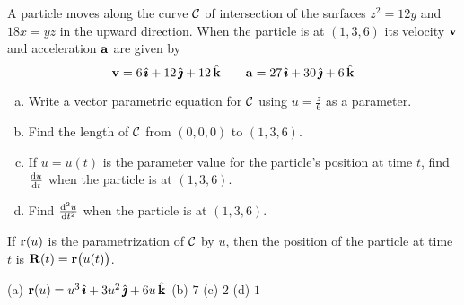 \begin{question}[M317 2000A] %
 A particle moves along the curve $\mathcal{C}$ of intersection of
the surfaces $z^2=12y$ and $18x=yz$ in the upward direction. When the particle
is at $(1,3,6)$ its velocity $\mathbf{v}$ and acceleration $\mathbf{a}$ are given by
$$
\mathbf{v} =6\,\hat{\pmb{\imath}}+12\,\hat{\pmb{\jmath}}+12\,\hat{\mathbf{k}}\qquad
\mathbf{a} = 27\,\hat{\pmb{\imath}}+30\,\hat{\pmb{\jmath}}+6\,\hat{\mathbf{k}}
$$
\begin{enumerate}[(a)]
\item
 Write a vector parametric equation for $\mathcal{C}$ using 
$u=\frac{z}{6}$ as a parameter.
\item
 Find the length of $\mathcal{C}$ from $(0,0,0)$ to $(1,3,6)$.
\item
 If $u=u(t)$ is the parameter value for the particle's position
at time $t$, find $\diff{u}{t}$ when the particle is at $(1,3,6)$.
\item
 Find $\difftwo{u}{t}$ when the particle is at $(1,3,6)$.
\end{enumerate}
\end{question}

\begin{hint} 
If $\mathbf{r}(u)$ is the parametrization of $\mathcal{C}$ by $u$, then
the position of the particle at time $t$ is $\mathbf{R}(t) = \mathbf{r}\big(u(t)\big)$.
\end{hint}

\begin{answer} 
(a)  $\mathbf{r}(u)=u^3\,\hat{\pmb{\imath}}+3u^2\,\hat{\pmb{\jmath}}+6u\,\hat{\mathbf{k}}$\qquad
(b)  $7$\qquad
(c)  $2$\qquad
(d)  $1$
\end{answer}

